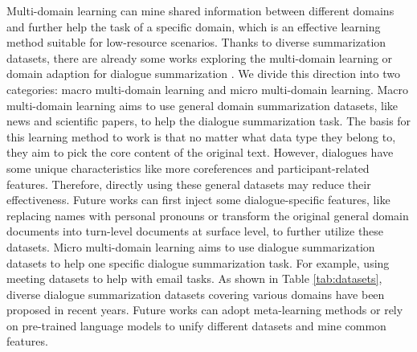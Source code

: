 Multi-domain learning can mine shared information between different domains and further help the task of a specific domain, which is an effective learning method suitable for low-resource scenarios.
Thanks to diverse summarization datasets, there are already some works exploring the multi-domain learning or domain adaption for dialogue summarization . 
We divide this direction into two categories: macro multi-domain learning and micro multi-domain learning. 
Macro multi-domain learning aims to use general domain summarization datasets, like news and scientific papers, to help the dialogue summarization task. 
The basis for this learning method to work is that no matter what data type they belong to, they aim to pick the core content of the original text.
However, dialogues have some unique characteristics like more coreferences and participant-related features. 
Therefore, directly using these general datasets may reduce their effectiveness.
Future works can first inject some dialogue-specific features, like replacing names with personal pronouns or transform the original general domain documents into turn-level documents at surface level, to further utilize these datasets.
Micro multi-domain learning aims to use dialogue summarization datasets to help one specific dialogue summarization task.
For example, using meeting datasets to help with email tasks. As shown in Table \ref{tab:datasets}, diverse dialogue summarization datasets covering various domains have been proposed in recent years. 
Future works can adopt meta-learning methods or rely on pre-trained language models to unify different datasets and mine common features.

